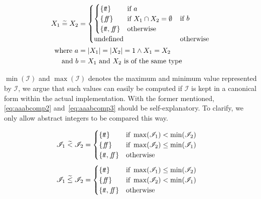 \begin{align} \nonumber
    X_1 \;\aab{=}\; X_2 &= \begin{cases}
        \begin{cases}
        \{\true\} & \text{if } a\\
        \{\false\} & \text{if } X_1 \cap X_2 = \emptyset \\
        \{\true, \false\} & \text{otherwise }
        \end{cases} & \text{if $b$} \\
        \text{undefined} & \text{otherwise}
    \end{cases}\\
    \text{where } a&=|X_1| = |X_2| = 1 \land X_1 = X_2 \nonumber\\
    \text{and } b&=X_1 \text{ and } X_2 \text{ is of the same type}
    \label{eq:aaabcomp}
\end{align}

$\min(\mathscr{I})$ and $\max(\mathscr{I})$ denotes the maximum and minimum value represented by $\mathscr{I}$, we argue that such values can easily be computed if $\mathscr{I}$ is kept in a canonical form within the actual implementation.
With the former mentioned, \autoref{eq:aaabcomp2} and~\ref{eq:aaabcomp3} should be self-explanatory.
To clarify, we only allow abstract integers to be compared this way.

\begin{align}\label{eq:aaabcomp2}
    \mathscr{I}_1 \;\aab{<}\; \mathscr{I}_2 &= \begin{cases}
        \{\true\} & \text{if } \max(\mathscr{I}_1) < \min(\mathscr{I}_2) \\
        \{\false\} & \text{if } \max(\mathscr{I}_2) \leq \min (\mathscr{I}_1) \\
        \{\true, \false\} & \text{otherwise}
    \end{cases}
\end{align}
\begin{align}\label{eq:aaabcomp3}
    \mathscr{I}_1 \;\aab{\leq}\; \mathscr{I}_2 &= \begin{cases}
        \{\true\} & \text{if } \max(\mathscr{I}_1) \leq \min(\mathscr{I}_2) \\
        \{\false\} & \text{if } \max(\mathscr{I}_2) < \min (\mathscr{I}_1) \\
        \{\true, \false\} & \text{otherwise}
    \end{cases}
\end{align}

